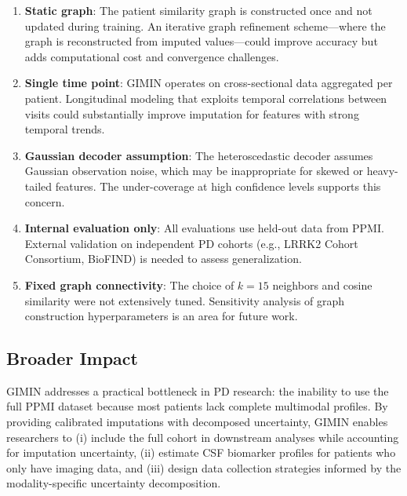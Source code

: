 \documentclass[journal,twoside,web]{ieeecolor}
\begin{document}
\begin{enumerate}
    \item \textbf{Static graph}: The patient similarity graph is constructed once and not updated during training. An iterative graph refinement scheme---where the graph is reconstructed from imputed values---could improve accuracy but adds computational cost and convergence challenges.

    \item \textbf{Single time point}: GIMIN operates on cross-sectional data aggregated per patient. Longitudinal modeling that exploits temporal correlations between visits could substantially improve imputation for features with strong temporal trends.

    \item \textbf{Gaussian decoder assumption}: The heteroscedastic decoder assumes Gaussian observation noise, which may be inappropriate for skewed or heavy-tailed features. The under-coverage at high confidence levels supports this concern.

    \item \textbf{Internal evaluation only}: All evaluations use held-out data from PPMI. External validation on independent PD cohorts (e.g., LRRK2 Cohort Consortium, BioFIND) is needed to assess generalization.

    \item \textbf{Fixed graph connectivity}: The choice of $k = 15$ neighbors and cosine similarity were not extensively tuned. Sensitivity analysis of graph construction hyperparameters is an area for future work.
\end{enumerate}

\subsection{Broader Impact}

GIMIN addresses a practical bottleneck in PD research: the inability to use the full PPMI dataset because most patients lack complete multimodal profiles. By providing calibrated imputations with decomposed uncertainty, GIMIN enables researchers to (i) include the full cohort in downstream analyses while accounting for imputation uncertainty, (ii) estimate CSF biomarker profiles for patients who only have imaging data, and (iii) design data collection strategies informed by the modality-specific uncertainty decomposition.

\end{document}
